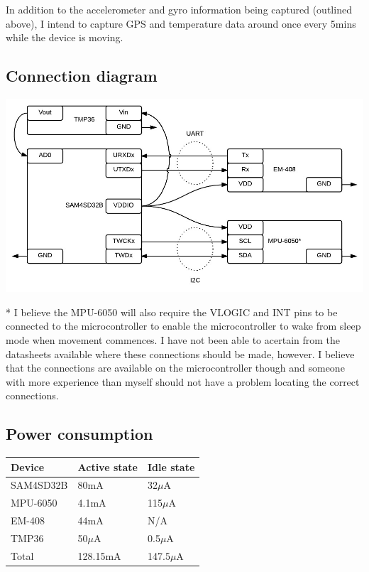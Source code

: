 \documentclass[a4paper, twoside]{article}
\begin{document}
In addition to the accelerometer and gyro information being captured (outlined
above), I intend to capture GPS and temperature data around once every 5mins while the device is
moving.

\clearpage
\subsection{Connection diagram}
\begin{center}
\includegraphics[scale=0.45]{images/connectiondiagram.jpg}
\end{center}
* I believe the MPU-6050 will also require the VLOGIC and INT pins to be
connected to the microcontroller to enable the microcontroller to wake from
sleep mode when movement commences. I have not been able to acertain from the
datasheets available where these connections should be made, however. I believe
that the connections are available on the microcontroller though and someone
with more experience than myself should not have a problem locating the correct
connections.

\subsection{Power consumption}

\begin{tabular}{|l|l|l|}
	\hline
	\textbf{Device} & \textbf{Active state} & \textbf{Idle state} \\
	\hline
	\hline
	SAM4SD32B & 80mA & 32$\mu$A \\
	MPU-6050 & 4.1mA & 115$\mu$A \\
	EM-408 & 44mA & N/A \\
	TMP36 & 50$\mu$A & 0.5$\mu$A \\
	\hline
	\hline
	Total & 128.15mA & 147.5$\mu$A \\
	\hline
\end{tabular}
\end{document}
